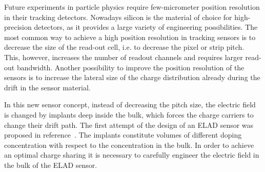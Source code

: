 
Future experiments in particle physics require few-micrometer position resolution in their tracking detectors. 
Nowadays silicon is the material of choice for high-precision detectors, as it provides a large variety of engineering possibilities. 
The most common way to achieve a high position resolution in tracking sensors is to decrease the size of the read-out cell, i.e. to decrease the pixel or strip pitch. 
This, however, increases the number of readout channels and requires larger read-out bandwidth. 
Another possibility to improve the position resolution of the sensors is to increase the lateral size of the charge distribution already during the drift in the sensor material. 

In this new sensor concept, instead of decreasing the pitch size, the electric field is changed by implants deep inside the bulk, which forces the charge carriers to change their drift path. 
The first attempt of the design of an ELAD sensor was proposed in reference~\cite{JANSEN2016242}.
The implants constitute volumes of different doping concentration with respect to the concentration in the bulk. 
In order to achieve an optimal charge sharing it is necessary to carefully engineer the electric field in the bulk of the ELAD sensor. %
